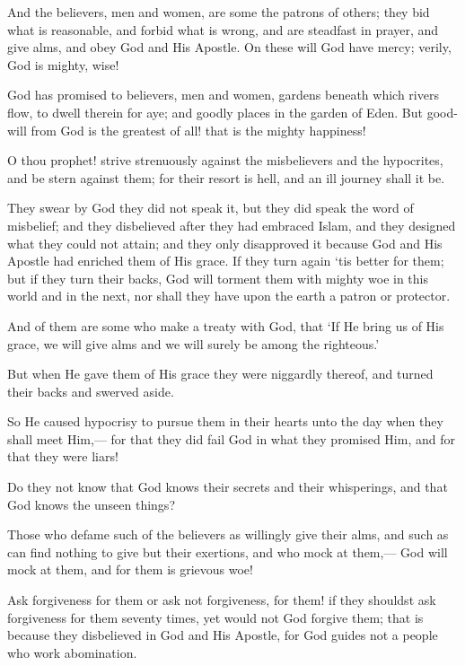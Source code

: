 \documentclass[fontsize=14pt, letterpaper, notitlepage, openany, DIV=12]{scrbook} %
\begin{document}
\noindent[9:71]
And the believers, men and women, are some the patrons of others; they bid what is
reasonable, and forbid what is wrong, and are steadfast in prayer, and give alms, and obey God
and His Apostle. On these will God have mercy; verily, God is mighty, wise!

\noindent[9:72]
God has promised to believers, men and women, gardens beneath which rivers flow, to
dwell therein for aye; and goodly places in the garden of Eden. But good-will from God is the
greatest of all! that is the mighty happiness!

\noindent[9:73]
O thou prophet! strive strenuously against the misbelievers and the hypocrites, and be
stern against them; for their resort is hell, and an ill journey shall it be.

\noindent[9:74]
They swear by God they did not speak it, but they did speak the word of misbelief; and
they disbelieved after they had embraced Islam, and they designed what they could not attain;
and they only disapproved it because God and His Apostle had enriched them of His grace. If
they turn again `tis better for them; but if they turn their backs, God will torment them with
mighty woe in this world and in the next, nor shall they have upon the earth a patron or protector.

\noindent[9:75]
And of them are some who make a treaty with God, that `If He bring us of His grace, we
will give alms and we will surely be among the righteous.'

\noindent[9:76]
But when He gave them of His grace they were niggardly thereof, and turned their backs
and swerved aside.

\noindent[9:77]
So He caused hypocrisy to pursue them in their hearts unto the day when they shall meet
Him,--- for that they did fail God in what they promised Him, and for that they were liars!

\noindent[9:78]
Do they not know that God knows their secrets and their whisperings, and that God
knows the unseen things?

\noindent[9:79]
Those who defame such of the believers as willingly give their alms, and such as can find
nothing to give but their exertions, and who mock at them,--- God will mock at them, and for
them is grievous woe!

\noindent[9:80]
Ask forgiveness for them or ask not forgiveness, for them! if they shouldst ask
forgiveness for them seventy times, yet would not God forgive them; that is because they
disbelieved in God and His Apostle, for God guides not a people who work abomination.
\end{document}
